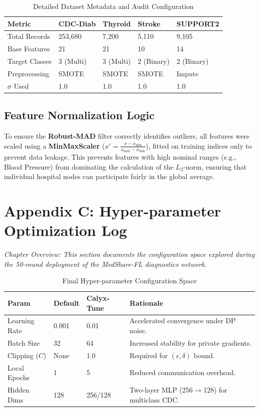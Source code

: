 \documentclass[10pt, a4paper, twocolumn]{article}
\begin{document}
\begin{table}[hbt!]
\centering
\scriptsize
\begin{tabular}{lp{1.4cm}p{1.4cm}p{1.4cm}p{1.4cm}}
\toprule
\textbf{Metric} & \textbf{CDC-Diab} & \textbf{Thyroid} & \textbf{Stroke} & \textbf{SUPPORT2} \\
\midrule
Total Records & 253,680 & 7,200 & 5,110 & 9,105 \\
Base Features & 21 & 21 & 10 & 14 \\
Target Classes & 3 (Multi) & 3 (Multi) & 2 (Binary) & 2 (Binary) \\
Preprocessing & SMOTE & SMOTE & SMOTE & Impute \\
$\sigma$ Used & 1.0 & 1.0 & 1.0 & 1.0 \\
\bottomrule
\end{tabular}
\caption{Detailed Dataset Metadata and Audit Configuration}
\end{table}

\subsection*{Feature Normalization Logic}
To ensure the \textbf{Robust-MAD} filter correctly identifies outliers, all features were scaled using a \textbf{MinMaxScaler} ($x' = \frac{x - x_{\min}}{x_{\max} - x_{\min}}$), fitted on training indices only to prevent data leakage. This prevents features with high nominal ranges (e.g., Blood Pressure) from dominating the calculation of the $L_2$-norm, ensuring that individual hospital nodes can participate fairly in the global average.

\section*{Appendix C: Hyper-parameter Optimization Log}

\textit{Chapter Overview: This section documents the configuration space explored during the 50-round deployment of the MedShare-FL diagnostics network.}

\begin{table}[hbt!]
\centering
\scriptsize
\begin{tabular}{lp{1.5cm}p{1.5cm}p{2.5cm}}
\toprule
\textbf{Param} & \textbf{Default} & \textbf{Calyx-Tune} & \textbf{Rationale} \\
\midrule
Learning Rate & 0.001 & 0.01 & Accelerated convergence under DP noise. \\
Batch Size & 32 & 64 & Increased stability for private gradients. \\
Clipping ($C$) & None & 1.0 & Required for $(\epsilon, \delta)$ bound. \\
Local Epochs & 1 & 5 & Reduced communication overhead. \\
Hidden Dims & 128 & 256/128 & Two-layer MLP (256$\to$128) for multiclass CDC. \\
\bottomrule
\end{tabular}
\caption{Final Hyper-parameter Configuration Space}
\end{table}
\end{document}
